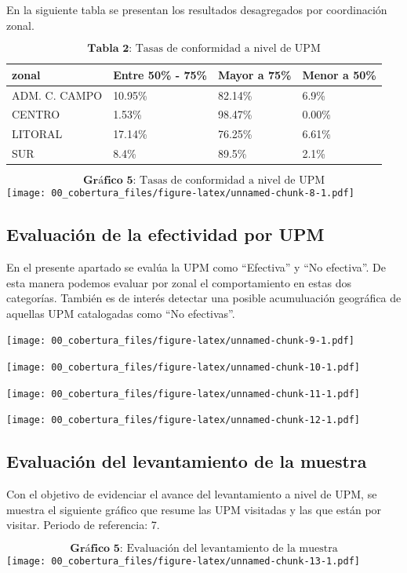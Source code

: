 \documentclass[
]{article}
\begin{document}
En la siguiente tabla se presentan los resultados desagregados por
coordinación zonal.

\[\textbf{Tabla 2: }\text{Tasas de conformidad a nivel de UPM}\]

\begin{longtable}[]{@{}llll@{}}
\toprule
zonal & Entre 50\% - 75\% & Mayor a 75\% & Menor a 50\% \\
\midrule
\endhead
ADM. C. CAMPO & 10.95\% & 82.14\% & 6.9\% \\
CENTRO & 1.53\% & 98.47\% & 0.00\% \\
LITORAL & 17.14\% & 76.25\% & 6.61\% \\
SUR & 8.4\% & 89.5\% & 2.1\% \\
\bottomrule
\end{longtable}

\[\textbf{Gráfico 5: }\text{Tasas de conformidad a nivel de UPM}\]
\texttt{[image: 00\_cobertura\_files/figure-latex/unnamed-chunk-8-1.pdf]}

\newpage
\textcolor{trueblue}{\section{Evaluación de la efectividad por UPM }}

En el presente apartado se evalúa la UPM como ``Efectiva'' y ``No
efectiva''. De esta manera podemos evaluar por zonal el comportamiento
en estas dos categorías. También es de interés detectar una posible
acumuluación geográfica de aquellas UPM catalogadas como ``No
efectivas''.

\texttt{[image: 00\_cobertura\_files/figure-latex/unnamed-chunk-9-1.pdf]}

\texttt{[image: 00\_cobertura\_files/figure-latex/unnamed-chunk-10-1.pdf]}

\texttt{[image: 00\_cobertura\_files/figure-latex/unnamed-chunk-11-1.pdf]}

\texttt{[image: 00\_cobertura\_files/figure-latex/unnamed-chunk-12-1.pdf]}

\textcolor{trueblue}{\section{Evaluación del levantamiento de la muestra}}

Con el objetivo de evidenciar el avance del levantamiento a nivel de
UPM, se muestra el siguiente gráfico que resume las UPM visitadas y las
que están por visitar. Periodo de referencia: 7.

\[\textbf{Gráfico 5:}\text{ Evaluación del levantamiento de la muestra}\]
\texttt{[image: 00\_cobertura\_files/figure-latex/unnamed-chunk-13-1.pdf]}
\end{document}
